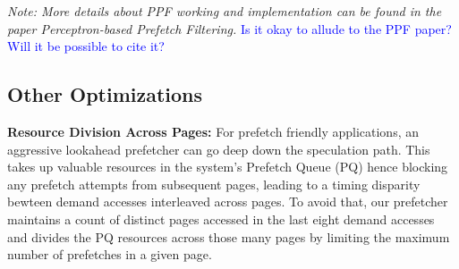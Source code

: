 \textit {Note: More details about PPF working and implementation can be found 
in the paper Perceptron-based Prefetch Filtering.}
\textcolor{blue}{Is it okay to allude to the PPF paper? Will it be possible to cite it?}

\subsection{Other Optimizations}
\label{Enhancements-Misc}

\noindent \textbf{Resource Division Across Pages:}
For prefetch friendly applications, an aggressive lookahead prefetcher can go
deep down the speculation path. This takes up valuable resources in the system's Prefetch 
Queue (PQ) hence blocking any prefetch attempts from subsequent pages, leading to a timing
disparity bewteen demand accesses interleaved across pages. To avoid that, our prefetcher 
maintains a count of distinct pages accessed in the last eight demand accesses and divides the
PQ resources across those many pages by limiting the maximum number of prefetches in a given 
page.
